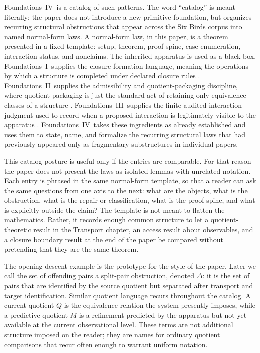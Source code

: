 \documentclass[11pt]{article}
\newcommand{\FIV}{Foundations~IV}
\newcommand{\FoundI}{Foundations~I}
\newcommand{\FoundII}{Foundations~II}
\newcommand{\FoundIII}{Foundations~III}
\newcommand{\currQ}{Q}                 \newcommand{\predM}{M}                 \newcommand{\splitObs}{\Delta}         \newcommand{\quotMap}{\pi}             \newcommand{\accessQ}{q_I}             \newcommand{\obsSig}{\sigma_I}         \newcommand{\closureForm}{\mathsf{cl}} \newcommand{\BirdInt}{\mathsf{BirdInt}}
\theoremstyle{definition}
\begin{document}
\FIV\ is a catalog of such patterns.  The word ``catalog'' is meant
literally: the paper does not introduce a new primitive foundation,
but organizes recurring structural obstructions that appear across
the Six Birds corpus into named normal-form laws.  A normal-form law,
in this paper, is a theorem presented in a fixed template: setup,
theorem, proof spine, case enumeration, interaction status, and
nonclaims.  The inherited apparatus is used as a black box.
\FoundI\ supplies the closure-formation language, meaning the
operations by which a structure is completed under declared closure
rules \citep{Tsiokos2026EmergenceCalculus}.  \FoundII\ supplies the
admissibility and quotient-packaging discipline, where quotient
packaging is just the standard act of retaining only equivalence
classes of a structure \citep{Tsiokos2026FoundationsII}.
\FoundIII\ supplies the finite audited interaction judgment used to
record when a proposed interaction is legitimately visible to the
apparatus \citep{Tsiokos2026FoundationsIII}.  \FIV\ takes these
ingredients as already established and uses them to state, name, and
formalize the recurring structural laws that had previously appeared
only as fragmentary substructures in individual papers.

This catalog posture is useful only if the entries are comparable.
For that reason the paper does not present the laws as isolated
lemmas with unrelated notation.  Each entry is phrased in the same
normal-form template, so that a reader can ask the same questions
from one axis to the next: what are the objects, what is the
obstruction, what is the repair or classification, what is the proof
spine, and what is explicitly outside the claim?  The template is
not meant to flatten the mathematics.  Rather, it records enough
common structure to let a quotient-theoretic result in the Transport
chapter, an access result about observables, and a closure boundary
result at the end of the paper be compared without pretending that
they are the same theorem.

The opening descent example is the prototype for the style of the
paper.  Later we call the set of offending pairs a split-pair
obstruction, denoted \(\splitObs\): it is the set of pairs that are
identified by the source quotient but separated after transport and
target identification.  Similar quotient language recurs throughout
the catalog.  A current quotient \(\currQ\) is the equivalence
relation the system presently imposes, while a predictive quotient
\(\predM\) is a refinement predicted by the apparatus but not yet
available at the current observational level.  These terms are not
additional structure imposed on the reader; they are names for
ordinary quotient comparisons that recur often enough to warrant
uniform notation.
\end{document}
